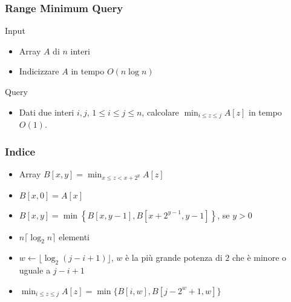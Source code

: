 




\begin{frame}
  \titlepage
\end{frame}


\begin{frame}[fragile]
\frametitle{Range Minimum Query}
\begin{block}{Input}
\begin{itemize}
\item
Array $A$ di $n$ interi
\item
Indicizzare $A$ in tempo $O(n \log n)$
\end{itemize}
\end{block}
\begin{block}{Query}
\begin{itemize}
\item
Dati due interi $i, j$, $1\le i\le j\le n$, calcolare $\min_{i\le z\le j}A[z]$ in tempo $O(1)$.
\end{itemize}
\end{block}
\end{frame}

\begin{frame}[fragile]
\frametitle{Indice}
\begin{itemize}
\item
Array $B[x,y] = \min_{x\le z < x+2^{y}}A[z] $
\item
$B[x,0] = A[x] $
\item
$B[x,y] = \min \left\{ B[x,y-1], B[x + 2^{y-1},y-1] \right\}$, se $y>0$
\item
$n \lceil  \log_{2} n \rceil$ elementi
\item
$w\gets \lfloor   \log_{2} (j-i+1) \rfloor$, $w$ è la più grande potenza di $2$ che è minore o uguale
a $j-i+1$
\item
$\min_{i\le z\le j}A[z] = \min \{ B[i, w], B[j - 2^{w} + 1, w]\}$
\end{itemize}
\end{frame}




